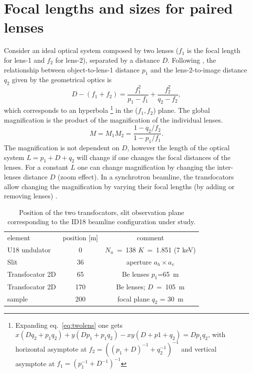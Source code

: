 \documentclass[9pt,twocolumn,twoside]{osajnl}
\begin{document}
\section{Focal lengths and sizes for paired lenses}

Consider an ideal optical system composed by two lenses ($f_1$ is the focal length for lens-1 and $f_2$ for lens-2), separated by a distance $D$. Following \cite{Goodman85}, the relationship between object-to-lens-1 distance $p_1$ and the lens-2-to-image distance $q_2$ given by the geometrical optics is
\begin{equation}
\label{eq:twolens}
    D-(f_1+f_2)=\frac{f_1^2}{p_1-f_1} + \frac{f_2^2}{q_2-f_2},
\end{equation}
which corresponds to an hyperbola
\footnote{Expanding eq.~\ref{eq:twolens} one gets $x(D q_2 + p_1 q_2) + y (D p_1 + p_1 q_2) - x y (D + p1 + q_2) = D p_1 q_2$,  with horizontal asymptote at $f_{2}=((p_1+D)^{-1}+q_2^{-1})^{-1}$ and vertical asymptote at $f_{1}=(p_1^{-1}+D^{-1})^{-1}$} in the ($f_1,f_2$) plane.
The global magnification is the product of the magnification of the individual lenses.
\begin{equation}
\label{eq:magnification}
    M=M_1 M_2=\frac{1-q_2/f_2}{1-p_1/f_1}.
\end{equation}
The magnification is not dependent on $D$, however the length of the optical system $L=p_1+D+q_2$ will change if one changes the focal distances of the lenses. For a constant $L$ one can change magnification by changing the inter-lenses distance $D$ (zoom effect). In a synchrotron beamline, the transfocators allow changing the magnification by varying their focal lengths (by adding or removing lenses) \cite{Vaughan:kv5084}.


\begin{table}[h]
    \caption{
    \label{table:id18parameters}
    Position of the two transfocators, slit observation plane corresponding to the ID18 beamline configuration under study. }
    \centering
    \begin{tabular}{l|c|c}
         element & position [m] & comment\\
         U18 undulator& 0 & $N_u$~=~138 $K$~=~1.851 (7 keV)\\
         Slit & 36 &
         aperture $a_h\times a_v$
         \\
         Transfocator 2D & 65 & Be lenses $p_1$=\SI{65}{\meter}
         \\ 
         Transfocator 2D & 170 & Be lenses;  $D$~=~\SI{105}{\meter} \\
         sample & 200 & focal plane $q_2$ = \SI{30}{m}
    \end{tabular}
\end{table}
\end{document}
